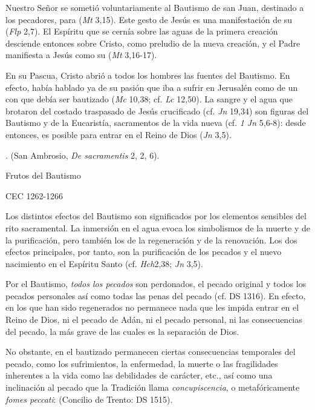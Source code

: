 	 Nuestro Señor se sometió voluntariamente al Bautismo de san Juan, destinado a los pecadores, para  (\emph{Mt} 3,15). Este gesto de Jesús es una manifestación de su  (\emph{Flp} 2,7). El Espíritu que se cernía sobre las aguas de la primera creación desciende entonces sobre Cristo, como preludio de la nueva creación, y el Padre manifiesta a Jesús como su  (\emph{Mt} 3,16-17).
	
	 En su Pascua, Cristo abrió a todos los hombres las fuentes del Bautismo. En efecto, había hablado ya de su pasión que iba a sufrir en Jerusalén como de un  con que debía ser bautizado (\emph{Mc} 10,38; cf. \emph{Lc} 12,50). La sangre y el agua que brotaron del costado traspasado de Jesús crucificado (cf. \emph{Jn} 19,34) son figuras del Bautismo y de la Eucaristía, sacramentos de la vida nueva (cf. \emph{1 Jn} 5,6-8): desde entonces, es posible  para entrar en el Reino de Dios (\emph{Jn} 3,5).
	
	. (San Ambrosio, \emph{De sacramentis} 2, 2, 6).
	
	Frutos del Bautismo
	
	CEC 1262-1266
	
	
	 Los distintos efectos del Bautismo son significados por los elementos sensibles del rito sacramental. La inmersión en el agua evoca los simbolismos de la muerte y de la purificación, pero también los de la regeneración y de la renovación. Los dos efectos principales, por tanto, son la purificación de los pecados y el nuevo nacimiento en el Espíritu Santo (cf. \emph{Hch}2,38; \emph{Jn} 3,5).
	
	
	Por el Bautismo, \emph{todos los pecados} son perdonados, el pecado original y todos los pecados personales así como todas las penas del pecado (cf. DS 1316). En efecto, en los que han sido regenerados no permanece nada que les impida entrar en el Reino de Dios, ni el pecado de Adán, ni el pecado personal, ni las consecuencias del pecado, la más grave de las cuales es la separación de Dios.
	
	 No obstante, en el bautizado permanecen ciertas consecuencias temporales del pecado, como los sufrimientos, la enfermedad, la muerte o las fragilidades inherentes a la vida como las debilidades de carácter, etc., así como una inclinación al pecado que la Tradición llama \emph{concupiscencia}, o metafóricamente \emph{fomes peccati}:  (Concilio de Trento: DS 1515).
	
